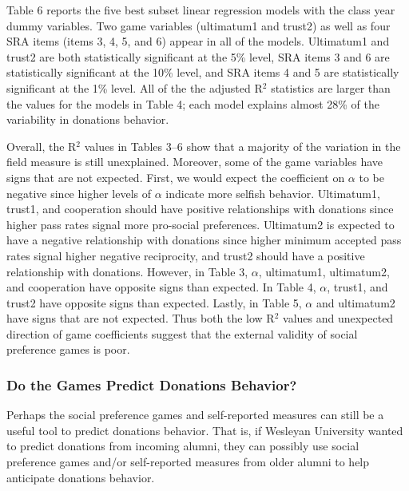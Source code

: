 \documentclass[12pt]{article}
\begin{document}
Table 6 reports the five best subset linear regression models with the class year dummy variables. Two game variables (ultimatum1 and trust2) as well as four SRA items (items 3, 4, 5, and 6) appear in all of the models. Ultimatum1 and trust2 are both statistically significant at the 5\% level, SRA items 3 and 6 are statistically significant at the 10\% level, and SRA items 4 and 5 are statistically significant at the 1\% level. All of the the adjusted R$^{2}$ statistics are larger than the values for the models in Table 4; each model explains almost 28\% of the variability in donations behavior. 

Overall, the R$^{2}$ values in Tables 3--6 show that a majority of the variation in the field measure is still unexplained. Moreover, some of the game variables have signs that are not expected. First, we would expect the coefficient on \(\alpha\) to be negative since higher levels of \(\alpha\) indicate more selfish behavior. Ultimatum1, trust1, and cooperation should have positive relationships with donations since higher pass rates signal more pro-social preferences. Ultimatum2 is expected to have a negative relationship with donations since higher minimum accepted pass rates signal higher negative reciprocity, and trust2 should have a positive relationship with donations. However, in Table 3, \(\alpha\), ultimatum1, ultimatum2, and cooperation have opposite signs than expected. In Table 4, \(\alpha\), trust1, and trust2 have opposite signs than expected. Lastly, in Table 5, \(\alpha\) and ultimatum2 have signs that are not expected. Thus both the low R$^{2}$ values and unexpected direction of game coefficients suggest that the external validity of social preference games is poor.

\subsubsection{Do the Games Predict Donations Behavior?}

Perhaps the social preference games and self-reported measures can still be a useful tool to predict donations behavior. That is, if Wesleyan University wanted to predict donations from incoming alumni, they can possibly use social preference games and/or self-reported measures from older alumni to help anticipate donations behavior.
\end{document}
